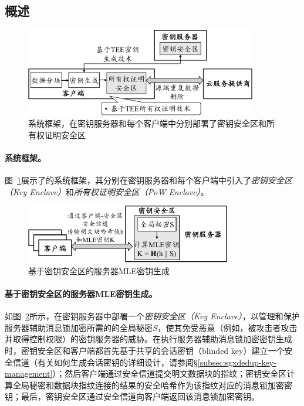\subsection{概述}
\label{subsec:sgxdedup-arch}

\begin{figure}[!htb]
  \centering
  \includegraphics[width=0.9\textwidth]{pic/sgxdedup/sgxdedup-arch.pdf}
  \caption{\sysnameS 系统框架，在密钥服务器和每个客户端中分别部署了密钥安全区和所有权证明安全区}
  \label{fig:sgxdedup-overview}
\end{figure}

\paragraph*{\sysnameS 系统框架。}图~\ref{fig:sgxdedup-overview}展示了\sysnameS 的系统框架，其分别在密钥服务器和每个客户端中引入了\textit{密钥安全区（Key Enclave）}和\textit{所有权证明安全区（PoW Enclave）}。 

\begin{figure}[!htb]
  \centering
  \includegraphics[width=0.8\textwidth]{pic/sgxdedup/key-enclave.pdf}
  \caption{基于密钥安全区的服务器MLE密钥生成}
  \label{fig:sgxdedup-overview-key}
\end{figure}

\paragraph*{基于密钥安全区的服务器MLE密钥生成。}如图~\ref{fig:sgxdedup-overview-key}所示，\sysnameS 在密钥服务器中部署一个\textit{密钥安全区（Key Enclave）}，以管理和保护服务器辅助消息锁加密所需的的全局秘密$S$，使其免受恶意（例如，被攻击者攻击并取得控制权限）的密钥服务器的威胁。在执行服务器辅助消息锁加密密钥生成时，密钥安全区和客户端都首先基于共享的会话密钥（blinded key）建立一个安全信道（有关如何生成会话密钥的详细设计，请参阅\S\ref{subsec:sgxdedup-key-management}）；然后客户端通过安全信道提交明文数据块的指纹；密钥安全区计算全局秘密和数据块指纹连接的结果的安全哈希作为该指纹对应的消息锁加密密钥；最后，密钥安全区通过安全信道向客户端返回该消息锁加密密钥。

